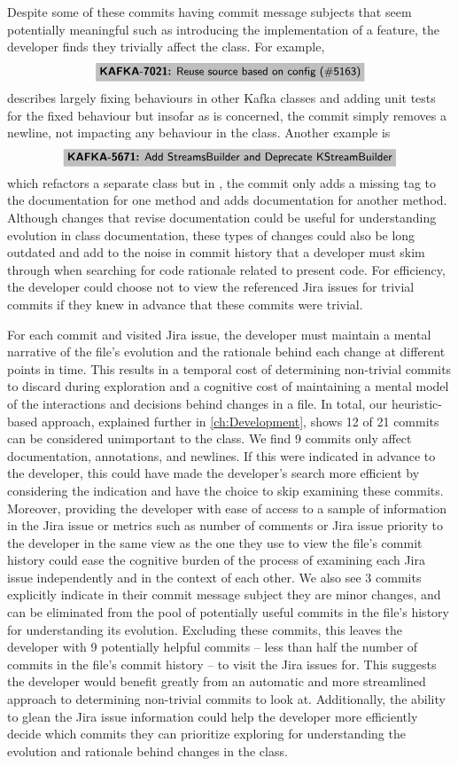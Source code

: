 Despite some of these commits having commit message subjects that seem potentially meaningful such as introducing the implementation of a feature, the developer finds they trivially affect the  class. 
For example, 
$$
\colorbox{lightgray}{\jira{KAFKA-7021:}{Reuse source based on config (\#5163)}} 
$$
describes largely fixing behaviours in other Kafka classes and adding unit tests for the fixed behaviour but insofar as  is concerned, the commit simply removes a newline, not impacting any behaviour in the class. 
Another example is 
$$
\colorbox{lightgray}{\jira{KAFKA-5671:}{Add StreamsBuilder and Deprecate KStreamBuilder}} 
$$
which refactors a separate class but in , the commit only adds a missing  tag to the documentation for one method and adds documentation for another method.
Although changes that revise documentation could be useful for understanding evolution in class documentation, these types of changes could also be long outdated and add to the noise in commit history that a developer must skim through when searching for code rationale related to present code.
For efficiency, the developer could choose not to view the referenced Jira issues for trivial commits if they knew in advance that these commits were trivial.

For each commit and visited Jira issue, the developer must maintain a mental narrative of the file's evolution and the rationale behind each change at different points in time. 
This results in a temporal cost of determining non-trivial commits to discard during exploration and a cognitive cost of maintaining a mental model of the interactions and decisions behind changes in a file. 
In total, our heuristic-based approach, explained further in \autoref{ch:Development}, shows 12 of 21 commits can be considered unimportant to the  class. 
We find 9 commits only affect documentation, annotations, and newlines.
If this were indicated in advance to the developer, this could have made the developer's search more efficient by considering the indication and have the choice to skip examining these commits.
Moreover, providing the developer with ease of access to a sample of information in the Jira issue or metrics such as number of comments or Jira issue priority to the developer in the same view as the one they use to view the file's commit history could ease the cognitive burden of the process of examining each Jira issue independently and in the context of each other.
We also see 3 commits explicitly indicate in their commit message subject they are minor changes, and can be eliminated from the pool of potentially useful commits in the file's history for understanding its evolution.
Excluding these commits, this leaves the developer with 9 potentially helpful commits -- less than half the number of commits in the file's commit history -- to visit the Jira issues for.
This suggests the developer would benefit greatly from an automatic and more streamlined approach to determining non-trivial commits to look at.
Additionally, the ability to glean the Jira issue information could help the developer more efficiently decide which commits they can prioritize exploring for understanding the evolution and rationale behind changes in the  class.

